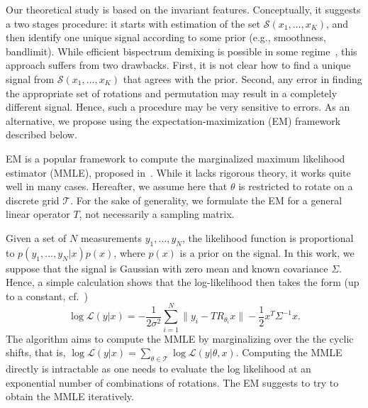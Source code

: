 \documentclass[english,12pt]{article}
\newcommand{\TODO}[1]{{\color{red}{[#1]}}}
\numberwithin{equation}{section}
\numberwithin{thm}{section} %
\begin{document}
Our theoretical study is based on the invariant features. Conceptually, it suggests a two stages procedure: it starts with estimation of the set $\mathcal{S}(x_1,\ldots,x_K)$, and then identify one unique signal according to some prior (e.g., smoothness, bandlimit).
While efficient bispectrum demixing is possible in some regime~\cite{boumal2018heterogeneous,weinthesis}, this approach suffers from two drawbacks. First, it is not clear how to find a unique signal from $\mathcal{S}(x_1,\ldots,x_K)$ that agrees with the prior.  Second, any error in finding the appropriate set of rotations and permutation may result in a  completely different signal. Hence, such a procedure may be very sensitive to errors. 
As an alternative, we propose using the expectation-maximization (EM) framework described below. 

EM is a popular  framework to compute the marginalized maximum likelihood estimator (MMLE), proposed in~\cite{dempster1977maximum}. While it lacks rigorous theory, it works quite well in many cases. Hereafter, we assume here that $\theta$ is restricted to rotate on a discrete grid $\mathcal{T}$. For the sake of generality, we formulate the EM for a general linear operator $T$, not necessarily a sampling matrix.

\TODO{To write here the explicit model with a general linear transformation}
Given a set of $N$ measurements $y_1,\ldots,y_N$, the likelihood function  is proportional to $p(y_1,\ldots,y_N|x)p(x)$, where $p(x)$ is a prior on the signal. 
In this work, we suppose that the signal is Gaussian with zero mean and known covariance $\Sigma$.
Hence,  a simple calculation shows that the log-likelihood  then takes the form (up to a constant, cf.~\cite{bendory2017bispectrum,abbe2018multireference})
\begin{equation}
\log \mathcal{L}(y|x)  = -\frac{1}{2\sigma^2}\sum_{i=1}^{N}\|y_i - TR_{\theta_i}x\| - \frac{1}{2}x^T\Sigma^{-1}x.
\end{equation}
The algorithm aims to compute the MMLE by marginalizing over the the cyclic shifts, that is,  $\log \mathcal{L}(y|x)  = \sum_{\theta\in\mathcal{T}}\log \mathcal{L}(y|\theta,x)$. Computing the MMLE directly is intractable as one needs to evaluate the log likelihood at  an exponential number of combinations of rotations. The EM suggests to try to obtain the MMLE iteratively. 
\end{document}
